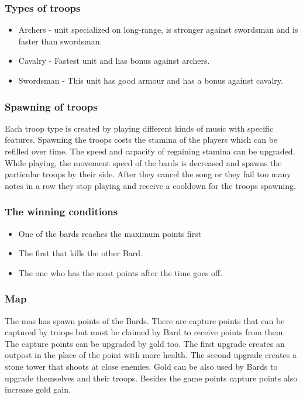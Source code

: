 \documentclass[a4paper,10pt,english]{article}
\begin{document}
\subsubsection*{Types of troops}
\begin{itemize}
    \item Archers - unit specialized on long-range, is stronger against swordsman and is faster than swordsman.
    \item Cavalry - Fastest unit and has bonus against archers.
    \item Swordsman - This unit has good armour and has a bonus against cavalry.
\end{itemize}
\subsubsection*{Spawning of troops}

Each troop type is created by playing different kinds of music with specific features. Spawning the troops costs the stamina of the players which can be refilled over time. The speed and capacity of regaining stamina can be upgraded. While playing, the movement speed of the bards is decreased and spawns the particular troops by their side. After they cancel the song or they fail too many notes in a row they stop playing and receive a cooldown for the troops spawning.

\subsubsection*{The winning conditions}

\begin{itemize}
    \item One of the bards reaches the maximum points first
    \item The first that kills the other Bard.
    \item The one who has the most points after the time goes off.
\end{itemize}

\subsubsection*{Map}

The mas has spawn points of the Bards. There are capture points that can be captured by troops but must be claimed by Bard to receive points from them. The capture points can be upgraded by gold too. The first upgrade creates an outpost in the place of the point with more health. The second upgrade creates a stone tower that shoots at close enemies. Gold can be also used by Bards to upgrade themselves and their troops. Besides the game points capture points also increase gold gain. 
\end{document}
